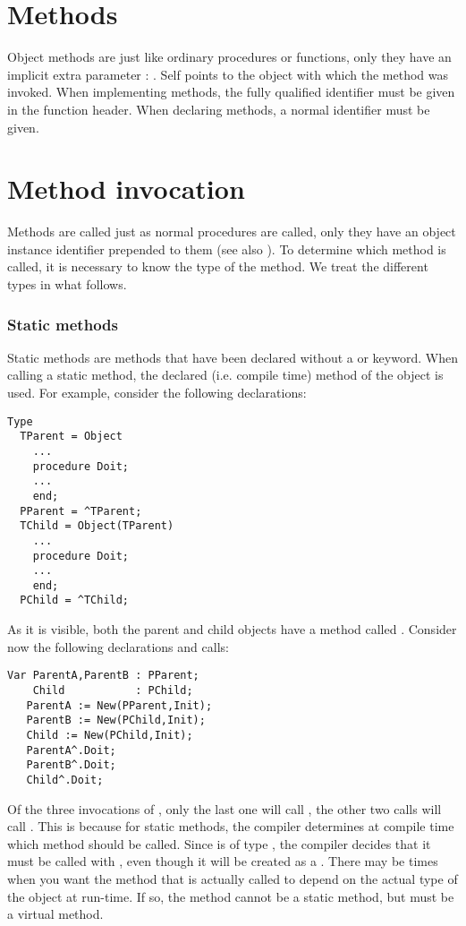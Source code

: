 \documentclass{report}
\begin{document}
\section{Methods}
Object methods are just like ordinary procedures or functions, only they
have an implicit extra parameter : . Self points to the object
with which the method was invoked.
When implementing methods, the fully qualified identifier must be given
in the function header. When declaring methods, a normal identifier must be
given.

\section{Method invocation}
Methods are called just as normal procedures are called, only they have an
object instance identifier prepended to them (see also ).
To determine which method is called, it is necessary to know the type of
the method. We treat the different types in what follows.
\subsubsection{Static methods}
Static methods are methods that have been declared without a 
or  keyword. When calling a static method, the declared (i.e.
compile time) method of the object is used.
For example, consider the following declarations:
\begin{verbatim}
Type
  TParent = Object
    ...
    procedure Doit;
    ...
    end;
  PParent = ^TParent;
  TChild = Object(TParent)
    ...
    procedure Doit;
    ...
    end;
  PChild = ^TChild;
\end{verbatim}
As it is visible, both the parent and child objects have a method called
. Consider now the following declarations and calls:
\begin{verbatim}
Var ParentA,ParentB : PParent;
    Child           : PChild;
   ParentA := New(PParent,Init);
   ParentB := New(PChild,Init);
   Child := New(PChild,Init);
   ParentA^.Doit;
   ParentB^.Doit;
   Child^.Doit;
\end{verbatim}
Of the three invocations of , only the last one will call
, the other two calls will call .
This is because for static methods, the compiler determines at compile
time which method should be called. Since  is of type
, the compiler decides that it must be called with
, even though it will be created as a .
There may be times when you want the method that is actually called to
depend on the actual type of the object at run-time. If so, the method
cannot be a static method, but must be a virtual method.
\end{document}
